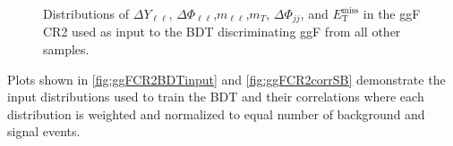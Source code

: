 \begin{figure}[!h]
  \hfill
{\caption{Distributions of $\Delta Y_{\ell\ell}$, $\Delta \Phi_{\ell\ell}$,$m_{\ell\ell}$,$m_T$, $\Delta \Phi_{jj}$, and $\ensuremath{E_{\text{T}}^{\text{miss}}}$ in the ggF CR2 used as input to the BDT discriminating ggF from all other samples.
\label{fig:ggFCR2}}}
\end{figure} 

Plots shown in \ref{fig:ggFCR2BDTinput} and \ref{fig:ggFCR2corrSB} demonstrate the input distributions used to train the BDT and their correlations where each distribution is weighted and normalized to equal number of background and signal events. 

